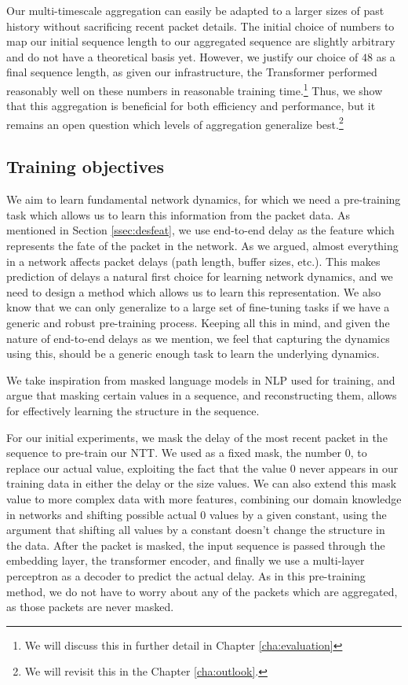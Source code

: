 Our multi-timescale aggregation can easily be adapted to a larger sizes of past history without sacrificing recent packet details. The initial choice of numbers to map our initial sequence length to our aggregated sequence are slightly arbitrary and do not have a theoretical basis yet. However, we justify our choice of $48$ as a final sequence length, as given our infrastructure, the Transformer performed reasonably well on these numbers in reasonable training time.\footnote{We will discuss this in further detail in Chapter \ref{cha:evaluation}} Thus, we show that this aggregation is beneficial for both efficiency and performance, but it remains an open question which levels of aggregation generalize best.\footnote{We will revisit this in the Chapter \ref{cha:outlook}.}


\subsection{Training objectives}
\label{ssec:despatt}

We aim to learn fundamental network dynamics, for which we need a pre-training task which allows us to learn this information from the packet data. As mentioned in Section \ref{ssec:desfeat}, we use end-to-end delay as the feature which represents the fate of the packet in the network. As we argued, almost everything in a network affects packet delays (\eg path length, buffer sizes, etc.). This makes prediction of delays a natural first choice for learning network dynamics, and we need to design a method which allows us to learn this representation. We also know that we can only generalize to a large set of fine-tuning tasks if we have a generic and robust pre-training process. Keeping all this in mind, and given the nature of end-to-end delays as we mention, we feel that capturing the dynamics using this, should be a generic enough task to learn the underlying dynamics.


We take inspiration from masked language models\cite{closemask} in NLP used for training, and argue that masking certain values in a sequence, and reconstructing them, allows for effectively learning the structure in the sequence.

For our initial experiments, we mask the delay of the most recent packet in the sequence to pre-train our NTT.  We used as a fixed mask, the number $0$, to replace our actual value, exploiting the fact that the value $0$ never appears in our training data in either the delay or the size values. We can also extend this mask value to more complex data with more features, combining our domain knowledge in networks and shifting possible actual $0$ values by a given constant, using the argument that shifting all values by a constant doesn't change the structure in the data. After the packet is masked, the input sequence is passed through the embedding layer, the transformer encoder, and finally we use a multi-layer perceptron as a decoder to predict the actual delay. As in this pre-training method, we do not have to worry about any of the packets which are aggregated, as those packets are never masked.


